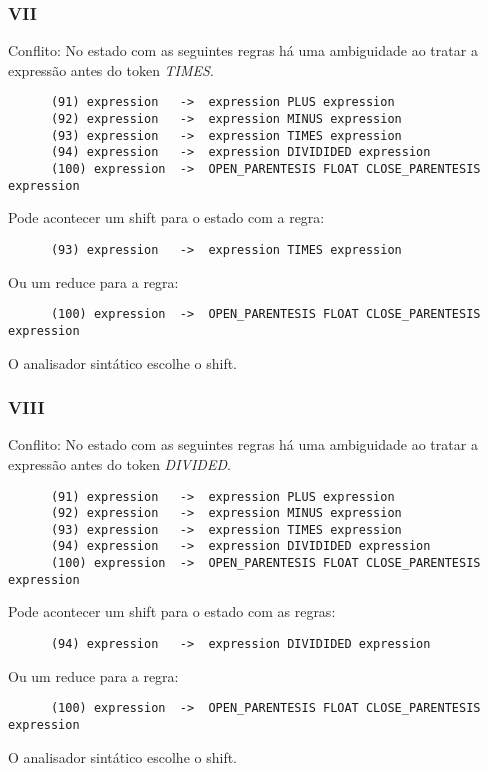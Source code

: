 \documentclass[a4paper,10pt]{article}
\begin{document}
    \subsubsection{VII}
      Conflito: No estado com as seguintes regras h\'a uma ambiguidade ao tratar a express\~ao antes do token \emph{TIMES}.
      \begin{lstlisting}
      (91) expression	->	expression PLUS expression
      (92) expression	->	expression MINUS expression
      (93) expression	->	expression TIMES expression
      (94) expression	->	expression DIVIDIDED expression
      (100) expression	->	OPEN_PARENTESIS FLOAT CLOSE_PARENTESIS expression
      \end{lstlisting}
      Pode acontecer um shift para o estado com a regra:
      \begin{lstlisting}
      (93) expression	->	expression TIMES expression
      \end{lstlisting}
      Ou um reduce para a regra:
      \begin{lstlisting}
      (100) expression	->	OPEN_PARENTESIS FLOAT CLOSE_PARENTESIS expression
      \end{lstlisting}
      O analisador sint\'atico escolhe o shift.
      \vspace{5mm}
      
    \subsubsection{VIII}
      Conflito: No estado com as seguintes regras h\'a uma ambiguidade ao tratar a express\~ao antes do token \emph{DIVIDED}.
      \begin{lstlisting}
      (91) expression	->	expression PLUS expression
      (92) expression	->	expression MINUS expression
      (93) expression	->	expression TIMES expression
      (94) expression	->	expression DIVIDIDED expression
      (100) expression	->	OPEN_PARENTESIS FLOAT CLOSE_PARENTESIS expression
      \end{lstlisting}
      Pode acontecer um shift para o estado com as regras:
      \begin{lstlisting}
      (94) expression	->	expression DIVIDIDED expression
      \end{lstlisting}
      Ou um reduce para a regra:
      \begin{lstlisting}
      (100) expression	->	OPEN_PARENTESIS FLOAT CLOSE_PARENTESIS expression
      \end{lstlisting}
      O analisador sint\'atico escolhe o shift.
      \vspace{5mm}
\end{document}
